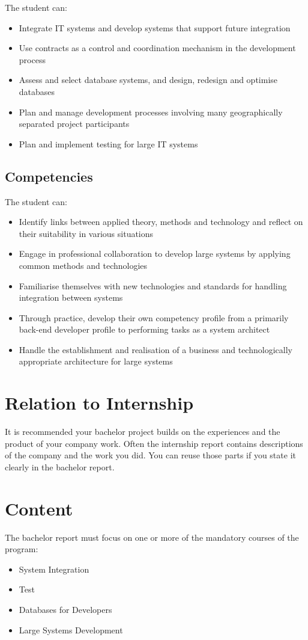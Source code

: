 \documentclass[12pt]{article}
\begin{document}
The student can:
\begin{itemize}
\item Integrate IT systems and develop systems that support future integration
\item Use contracts as a control and coordination mechanism in the development process
\item Assess and select database systems, and design, redesign and optimise databases
\item Plan and manage development processes involving many geographically separated project participants
\item Plan and implement testing for large IT systems
\end{itemize}

\subsection{Competencies}

The student can:
\begin{itemize}
\item Identify links between applied theory, methods and technology and reflect on their suitability in various situations
\item Engage in professional collaboration to develop large systems by applying common methods and technologies
\item Familiarise themselves with new technologies and standards for handling integration between systems
\item Through practice, develop their own competency profile from a primarily back-end developer profile to performing tasks as a system architect
\item Handle the establishment and realisation of a business and technologically appropriate architecture for large systems
\end{itemize}

\section{Relation to Internship}
It is recommended your bachelor project builds
on the experiences and the product of your
company work.
Often the internship report contains descriptions
of the company and the work you did. You can
reuse those parts if you state it clearly in the
bachelor report. 

\section{Content}
The bachelor report must focus on one or more of
the mandatory courses of the program:
\begin{itemize}
\item System Integration
\item Test
\item Databases for Developers
\item Large Systems Development\\
\end{itemize}
\end{document}
